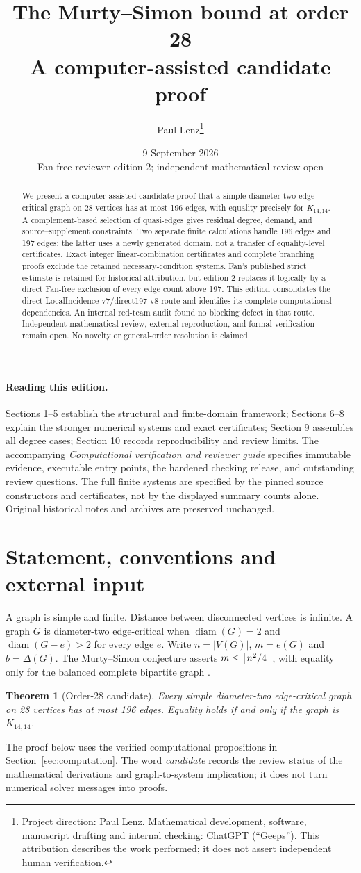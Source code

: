 \documentclass[11pt,a4paper]{article}
\title{The Murty--Simon bound at order 28\\\large A computer-assisted candidate proof}
\author{Paul Lenz\thanks{Project direction: Paul Lenz. Mathematical development, software, manuscript drafting and internal checking: ChatGPT (``Geeps''). This attribution describes the work performed; it does not assert independent human verification.}}
\date{9 September 2026\\\small Fan-free reviewer edition 2; independent mathematical review open}
\newtheorem{theorem}{Theorem}[section]\newtheorem{lemma}[theorem]{Lemma}\newtheorem{proposition}[theorem]{Proposition}\newtheorem{corollary}[theorem]{Corollary}\theoremstyle{definition}\newtheorem{definition}[theorem]{Definition}
\DeclareMathOperator{\diam}{diam}
\begin{document}
\maketitle
\begin{abstract}
We present a computer-assisted candidate proof that a simple diameter-two edge-critical graph on 28 vertices has at most 196 edges, with equality precisely for $K_{14,14}$. A complement-based selection of quasi-edges gives residual degree, demand, and source--supplement constraints. Two separate finite calculations handle 196 edges and 197 edges; the latter uses a newly generated domain, not a transfer of equality-level certificates. Exact integer linear-combination certificates and complete branching proofs exclude the retained necessary-condition systems. Fan's published strict estimate is retained for historical attribution, but edition 2 replaces it logically by a direct Fan-free exclusion of every edge count above 197. This edition consolidates the direct LocalIncidence-v7/direct197-v8 route and identifies its complete computational dependencies. An internal red-team audit found no blocking defect in that route. Independent mathematical review, external reproduction, and formal verification remain open. No novelty or general-order resolution is claimed.
\end{abstract}
\paragraph{Reading this edition.} Sections 1--5 establish the structural and finite-domain framework; Sections 6--8 explain the stronger numerical systems and exact certificates; Section 9 assembles all degree cases; Section 10 records reproducibility and review limits. The accompanying \emph{Computational verification and reviewer guide} specifies immutable evidence, executable entry points, the hardened checking release, and outstanding review questions. The full finite systems are specified by the pinned source constructors and certificates, not by the displayed summary counts alone. Original historical notes and archives are preserved unchanged.
\bigskip
\section{Statement, conventions and external input}
A graph is simple and finite. Distance between disconnected vertices is infinite. A graph $G$ is diameter-two edge-critical when $\diam(G)=2$ and $\diam(G-e)>2$ for every edge $e$. Write $n=|V(G)|$, $m=e(G)$ and $b=\Delta(G)$. The Murty--Simon conjecture asserts $m\le\left\lfloor n^2/4\right\rfloor$, with equality only for the balanced complete bipartite graph \cite{wang,fan}.
\begin{theorem}[Order-28 candidate]\label{thm:main}
Every simple diameter-two edge-critical graph on 28 vertices has at most 196 edges. Equality holds if and only if the graph is $K_{14,14}$.
\end{theorem}
The proof below uses the verified computational propositions in Section~\ref{sec:computation}. The word \emph{candidate} records the review status of the mathematical derivations and graph-to-system implication; it does not turn numerical solver messages into proofs.
\end{document}
